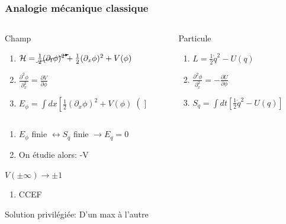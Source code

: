 \documentclass[handout]{beamer}
\begin{document}
\begin{frame} \frametitle{Analogie mécanique classique}
\begin{columns}[T]
    \begin{column}[T]{.55\linewidth}
    Champ
    \begin{enumerate}
    \item $\mathcal{H} =  \cancelto{}{\frac{1}{2}  (\partial_t \phi)^2} +  \frac{1}{2}  (\partial_x \phi)^2 +V(\phi) $
    \item $\frac{\partial^2\phi}{\partial_x^2} = \frac{\partial V}{\partial\phi}$
    \item $E_\phi = \int{dx\left[\frac{1}{2}  (\partial_x \phi)^2 +V(\phi) \right(]}$
    \end{enumerate}
    \end{column}
    \begin{column}[T]{.45\linewidth}
	Particule
    \begin{enumerate}
    \item $L =   \frac{1}{2}  \dot{q}^2 -U(q)$
    \item $\frac{\partial^2\phi}{\partial_x^2} = -\frac{\partial U}{\partial\phi}$
    \item $S_q = \int{dt[\frac{1}{2}  \dot{q}^2 -U(q)] }$
    \end{enumerate}
    \end{column}
  \end{columns}
   \begin{enumerate}
   \item $E_\phi$ finie $\leftrightarrow S_q$ finie $\rightarrow E_q = 0$
   \item On étudie alors: -V
   \end{enumerate}
  
\end{frame}

\begin{frame}
$V(\pm \infty) \rightarrow \pm 1$
\begin{enumerate}
\item CCEF\begin{figure}[0.3\textwidth]
    \end{figure}
\end{enumerate}
\begin{figure}
\end{figure}
Solution privilégiée: D'un max à l'autre
\end{frame}
\end{document}
